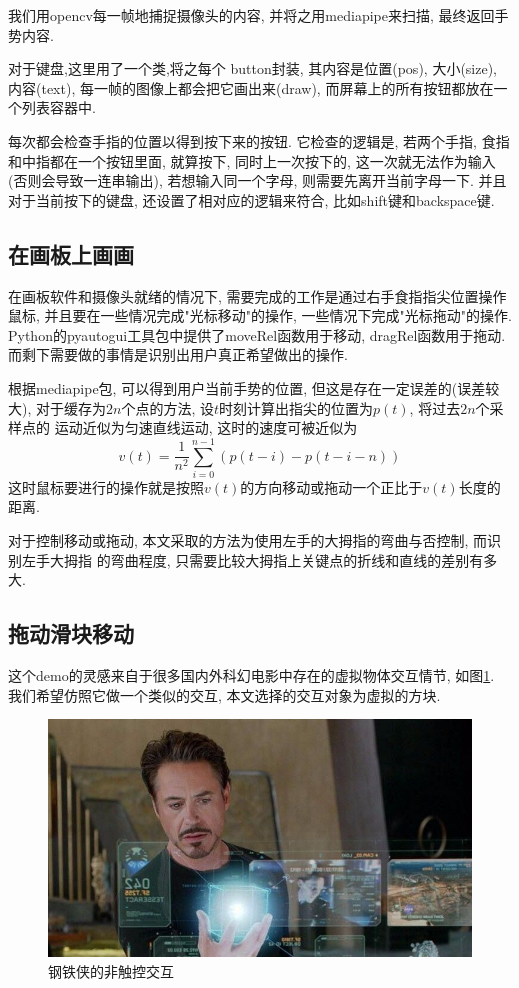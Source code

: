 \documentclass[lang=cn,11pt,a4paper]{elegantpaper}
\begin{document}
我们用opencv每一帧地捕捉摄像头的内容, 并将之用mediapipe来扫描, 
最终返回手势内容.
	     
对于键盘,这里用了一个类,将之每个 button封装, 
其内容是位置(pos), 大小(size), 内容(text), 每一帧的图像上都会把它画出来(draw), 
而屏幕上的所有按钮都放在一个列表容器中. 

每次都会检查手指的位置以得到按下来的按钮. 它检查的逻辑是, 
若两个手指, 食指和中指都在一个按钮里面, 就算按下, 同时上一次按下的, 
这一次就无法作为输入(否则会导致一连串输出), 若想输入同一个字母, 则需要先离开当前字母一下.  
并且对于当前按下的键盘, 还设置了相对应的逻辑来符合, 比如shift键和backspace键.

\subsection{在画板上画画}
在画板软件和摄像头就绪的情况下, 需要完成的工作是通过右手食指指尖位置操作鼠标, 
并且要在一些情况完成"光标移动"的操作, 一些情况下完成"光标拖动"的操作. 
Python的pyautogui工具包中提供了moveRel函数用于移动, dragRel函数用于拖动. 
而剩下需要做的事情是识别出用户真正希望做出的操作. 

根据mediapipe包, 可以得到用户当前手势的位置, 但这是存在一定误差的(误差较大), 
对于缓存为$2n$个点的方法, 设$t$时刻计算出指尖的位置为$p(t)$, 将过去$2n$个采样点的
运动近似为匀速直线运动, 这时的速度可被近似为
\[v(t)=\frac{1}{n^2}\sum_{i=0}^{n-1}(p(t-i)-p(t-i-n))\]
这时鼠标要进行的操作就是按照$v(t)$的方向移动或拖动一个正比于$v(t)$长度的距离. 

对于控制移动或拖动, 本文采取的方法为使用左手的大拇指的弯曲与否控制, 而识别左手大拇指
的弯曲程度, 只需要比较大拇指上关键点的折线和直线的差别有多大. 

\subsection{拖动滑块移动}
这个demo的灵感来自于很多国内外科幻电影中存在的虚拟物体交互情节, 如图\ref{block}. 
我们希望仿照它做一个类似的交互, 本文选择的交互对象为虚拟的方块. 
\begin{figure}[htb]
  \centering
  \includegraphics[width=.8\textwidth]{imgs/block.jpg}
  \caption{钢铁侠的非触控交互\label{block}}
\end{figure}
\end{document}
